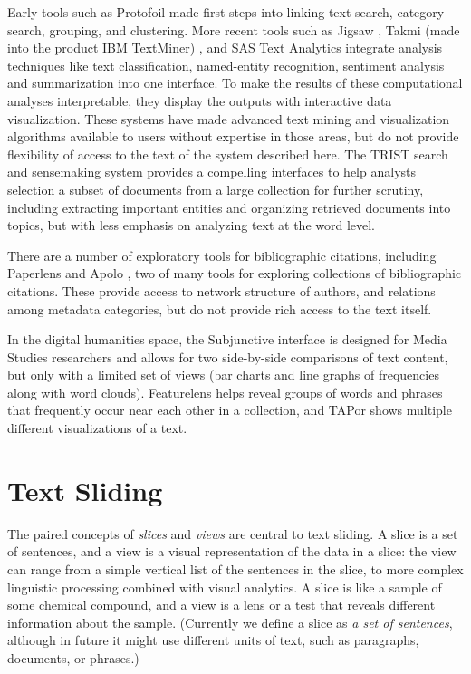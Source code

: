 \documentclass{sig-alternate}
\begin{document}
 Early tools such as Protofoil \cite{rao1994protofoil} made first steps into linking text search, category search, grouping, and clustering.  More recent tools such as Jigsaw \cite{gorg_combining_2012},  Takmi (made into the product IBM TextMiner) \cite{uramoto2004text}, and SAS Text Analytics integrate analysis techniques like text classification, named-entity recognition, sentiment analysis and summarization into one interface. 
 To make the results of these computational analyses interpretable, they display the outputs with interactive data visualization. These systems have made advanced text mining and visualization algorithms available to users without expertise in those areas, but do not provide flexibility of  access to the text of the system described here.   The TRIST search and sensemaking system \cite{jonker2005information} provides a compelling interfaces to help analysts selection a subset of documents from a large collection for further scrutiny, including extracting important entities and organizing retrieved documents into topics, but with less emphasis on analyzing text at the word level.

There are a number of exploratory tools for bibliographic citations, including Paperlens \cite{lee2005understanding} and Apolo \cite{chau2011apolo}, two  of many tools for exploring collections of bibliographic citations.  These provide access to network structure of authors, and relations among metadata categories, but do not provide rich access to the text itself.

In the digital humanities space, the Subjunctive interface \cite{bron2012subjunctive} is designed for Media Studies researchers and allows for two side-by-side comparisons of text content, but only with a limited set of views (bar charts and line graphs of frequencies along with word clouds). Featurelens \cite{don2007discovering} helps  reveal groups of words and phrases that frequently occur near each other in a collection, and
TAPor \cite{rockwell2003text} shows multiple different visualizations of a text.


\section{Text Sliding}

The paired concepts of \emph{slices} and \emph{views} are central to text sliding. A slice is a set of sentences, and a view is a visual representation of the data in a slice: the view can range from a simple vertical list of the sentences in the slice, to more complex linguistic processing combined with visual analytics.  A slice is like a sample of some chemical compound,  and a view is a lens or a test that reveals different information about the sample. (Currently we define a slice as \emph{a set of sentences}, although in future it might use different units of text, such as paragraphs, documents, or phrases.) 
\end{document}
